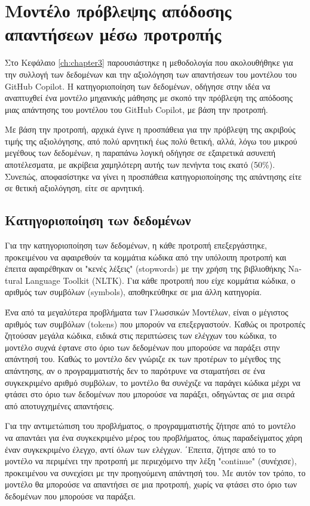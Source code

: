 \chapter{Μοντέλο πρόβλεψης απόδοσης απαντήσεων μέσω προτροπής}
\label{ch:chapter4}

Στο Κεφάλαιο \ref{ch:chapter3} παρουσιάστηκε η μεθοδολογία που
ακολουθήθηκε για την συλλογή των δεδομένων και την αξιολόγηση των
απαντήσεων του μοντέλου του \textlatin{GitHub Copilot}. Η
κατηγοριοποίηση των δεδομένων, οδήγησε στην ιδέα να αναπτυχθεί ένα
μοντέλο μηχανικής μάθησης με σκοπό την πρόβλεψη της απόδοσης μιας
απάντησης του μοντέλου του \textlatin{GitHub Copilot}, με βάση την
προτροπή.

Με βάση την προτροπή, αρχικά έγινε η προσπάθεια για την πρόβλεψη της
ακριβούς τιμής της αξιολόγησης, από πολύ αρνητική έως πολύ θετική, αλλά,
λόγω του μικρού μεγέθους των δεδομένων, η παραπάνω λογική οδήγησε σε
εξαιρετικά ασυνεπή αποτέλεσματα, με ακρίβεια χαμηλότερη αυτής των
πενήντα τοις εκατό (50\%). Συνεπώς, αποφασίστηκε να γίνει η προσπάθεια
κατηγοριοποίησης της απάντησης είτε σε θετική αξιολόγηση, είτε σε
αρνητική.

\section{Κατηγοριοποίηση των δεδομένων}

Για την κατηγοριοποίηση των δεδομένων, η κάθε προτροπή επεξεργάστηκε,
προκειμένου να αφαιρεθούν τα κομμάτια κώδικα από την υπόλοιπη προτροπή
και έπειτα αφαιρέθηκαν οι "κενές λέξεις" (\textlatin{stopwords}) με την
χρήση της βιβλιοθήκης \textlatin{Natural Language Toolkit (NLTK)}. Για
κάθε προτροπή που είχε κομμάτια κώδικα, ο αριθμός των συμβόλων
(\textlatin{symbols}), αποθηκεύθηκε σε μια άλλη κατηγορία.

Ένα από τα μεγαλύτερα προβλήματα των Γλωσσικών Μοντέλων, είναι ο
μέγιστος αριθμός των συμβόλων (\textlatin{tokens}) που μπορούν να
επεξεργαστούν. Καθώς οι προτροπές ζητούσαν μεγάλα κώδικα, ειδικά στις
περιπτώσεις των ελέγχων του κώδικα, το μοντέλο συχνά έφτανε στο όριο των
δεδομένων που μπορούσε να παράξει στην απάντησή του. Καθώς το μοντέλο
δεν γνώριζε εκ των προτέρων το μέγεθος της απάντησης, αν ο
προγραμματιστής δεν το παρότρυνε να σταματήσει σε ένα συγκεκριμένο
αριθμό συμβόλων, το μοντέλο θα συνέχιζε να παράγει κώδικα μέχρι να
φτάσει στο όριο των δεδομένων που μπορούσε να παράξει, οδηγώντας σε μια
σειρά από αποτυγχημένες απαντήσεις.

Για την αντιμετώπιση του προβλήματος, ο προγραμματιστής ζήτησε από το
μοντέλο να απαντάει για ένα συγκεκριμένο μέρος του προβλήματος, όπως
παραδείγματος χάρη έναν συγκεκριμένο έλεγχο, αντί όλων των ελέγχων.
΄Επειτα, ζήτησε από το το μοντέλο να περιμένει την προτροπή με
περιεχόμενο την λέξη "\textlatin{continue}" (συνέχισε), προκειμένου να
συνεχίσει με την προηγούμενη απάντησή του. Με αυτόν τον τρόπο, το
μοντέλο θα μπορούσε να απαντήσει σε μια προτροπή, χωρίς να φτάσει στο
όριο των δεδομένων που μπορούσε να παράξει.

